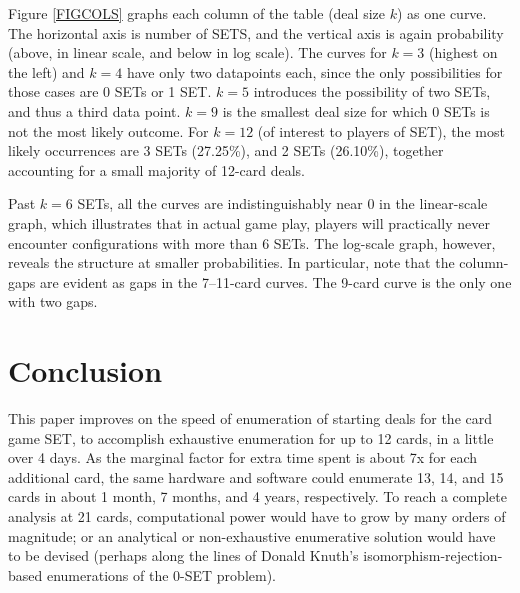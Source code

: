 \documentclass[10pt]{amsart}
\newcommand{\SET}{SET\texttrademark}  %
\begin{document}
Figure \ref{FIGCOLS} graphs each column of the table (deal size $k$) as one
curve. The horizontal axis is number of SETS, and the vertical axis is again
probability (above, in linear scale, and below in log scale). The curves for
$k=3$ (highest on the left) and $k=4$ have only two datapoints each, since the
only possibilities for those cases are 0 SETs or 1 SET. $k=5$ introduces the
possibility of two SETs, and thus a third data point. $k=9$ is the smallest deal
size for which 0 SETs is not the most likely outcome. For $k=12$ (of interest to
players of \SET), the most likely occurrences are 3 SETs (27.25\%), and 2 SETs
(26.10\%), together accounting for a small majority of 12-card deals.

Past $k=6$ SETs, all the curves are indistinguishably near 0 in the linear-scale
graph, which illustrates that in actual game play, players will practically
never encounter configurations with more than 6 SETs. The log-scale graph,
however, reveals the structure at smaller probabilities. In particular, note
that the column-gaps are evident as gaps in the 7--11-card curves. The 9-card
curve is the only one with two gaps.


\section{Conclusion}
This paper improves on the speed of enumeration of starting deals for the card
game \SET, to accomplish exhaustive enumeration for up to 12 cards, in a little
over 4 days. As the marginal factor for extra time spent is about 7x for each
additional card, the same hardware and software could enumerate 13, 14, and 15
cards in about 1 month, 7 months, and 4 years, respectively. To reach a complete
analysis at 21 cards, computational power would have to grow by many orders of
magnitude; or an analytical or non-exhaustive enumerative solution would have to
be devised (perhaps along the lines of Donald Knuth's
isomorphism-rejection-based enumerations of the 0-SET problem).
\end{document}
